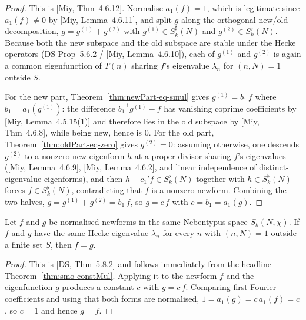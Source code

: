 \begin{proof}
\leanok
This is [Miy, Thm~4.6.12]. Normalise $a_1(f)=1$, which is legitimate since $a_1(f)\neq 0$ by
[Miy, Lemma~4.6.11], and split $g$ along the orthogonal new/old decomposition,
$g=g^{(1)}+g^{(2)}$ with $g^{(1)}\in S_k^{\sharp}(N)$ and $g^{(2)}\in S_k^{\flat}(N)$. Because both the new
subspace and the old subspace are stable under the Hecke operators (DS Prop~5.6.2 / [Miy, Lemma~4.6.10]),
each of $g^{(1)}$ and $g^{(2)}$ is again a common eigenfunction of $T(n)$ sharing $f$'s eigenvalue
$\lambda_n$ for $(n,N)=1$ outside $S$.

For the new part, Theorem~\ref{thm:newPart-eq-smul} gives $g^{(1)}=b_1\,f$ where $b_1=a_1(g^{(1)})$: the
difference $b_1^{-1}g^{(1)}-f$ has vanishing coprime coefficients by [Miy, Lemma~4.5.15(1)] and therefore
lies in the old subspace by [Miy, Thm~4.6.8], while being new, hence is $0$. For the old part,
Theorem~\ref{thm:oldPart-eq-zero} gives $g^{(2)}=0$: assuming otherwise, one descends $g^{(2)}$ to a
nonzero new eigenform $h$ at a proper divisor sharing $f$'s eigenvalues ([Miy, Lemma~4.6.9],
[Miy, Lemma~4.6.2], and linear independence of distinct-eigenvalue eigenforms), and then
$h-c_1'f\in S_k^{\flat}(N)$ together with $h\in S_k^{\flat}(N)$ forces $f\in S_k^{\flat}(N)$, contradicting
that $f$ is a nonzero newform. Combining the two halves, $g=g^{(1)}+g^{(2)}=b_1\,f$, so $g=c\,f$ with
$c=b_1=a_1(g)$.
\end{proof}

\begin{theorem}\label{thm:smo-clean}
\leanok
Let $f$ and $g$ be normalised newforms in the same Nebentypus space $S_k(N,\chi)$. If $f$ and $g$ have the
same Hecke eigenvalue $\lambda_n$ for every $n$ with $(n,N)=1$ outside a finite set $S$, then $f=g$.
\end{theorem}

\begin{proof}
\leanok
This is [DS, Thm~5.8.2] and follows immediately from the headline Theorem~\ref{thm:smo-constMul}. Applying
it to the newform $f$ and the eigenfunction $g$ produces a constant $c$ with $g=c\,f$. Comparing first
Fourier coefficients and using that both forms are normalised, $1=a_1(g)=c\,a_1(f)=c$, so $c=1$ and hence
$g=f$.
\end{proof}
